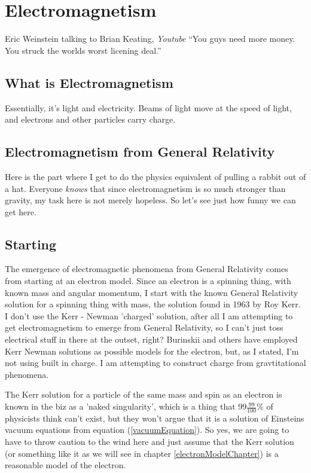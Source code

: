 \documentclass[../rzero]{subfiles}
\begin{document}
\chapter{Electromagnetism}\label{electromagnetismChapter}

\begin{chapquote}{Eric Weinstein talking to Brian Keating, \textit{Youtube\cite{drbriankeatingEricWeinsteinTheoretical2020}}}
``You guys need more money. You struck the worlds worst licening deal.''
\end{chapquote}


\section{What is Electromagnetism}
Essentially, it's light and electricity. Beams of light move at the speed of light, and electrons and other particles carry charge. 

\section{Electromagnetism from General Relativity}
Here is the part where I get to do the physics equivalent of pulling a rabbit out of a hat. Everyone \textit{knows} that since electromagnetism is so much stronger than gravity, my task here is not merely hopeless. So let's see just how funny we can get here. 



\section{Starting}
The emergence of electromagnetic phenomena from General Relativity comes from starting at an electron model. Since an electron is a spinning thing, with known mass and angular momentum, I start with the known General Relativity solution for a spinning thing with mass, the  solution found in 1963 by Roy Kerr\cite{kerrGravitationalFieldSpinning1963}. I don't use the Kerr - Newman 'charged' solution\cite{newmanNoteKerrSpinningParticle1965}, after all I am attempting to get electromagnetism to emerge from General Relativity, so I can't just toss electrical stuff in there at the outset, right? Burinskii\cite{Burinskii2008} and others have employed Kerr Newman solutions as possible models for the electron, but, as I stated, I'm not using built in charge. I am attempting to construct charge from gravtitational phenomena.

The Kerr solution for a particle of the same mass and spin as an electron is known in the biz as a 'naked singularity', which is a thing that 99$\frac{99}{100}$\% of physicists think can't exist, but they won't argue that it is a solution of Einsteins vacuum equations from equation (\ref{vacuumEquation}). So yes, we are going to have to throw caution to the wind here and just assume that the Kerr solution (or something like it as we will see in chapter \ref{electronModelChapter}) is a reasonable model of the electron. 
\end{document}
